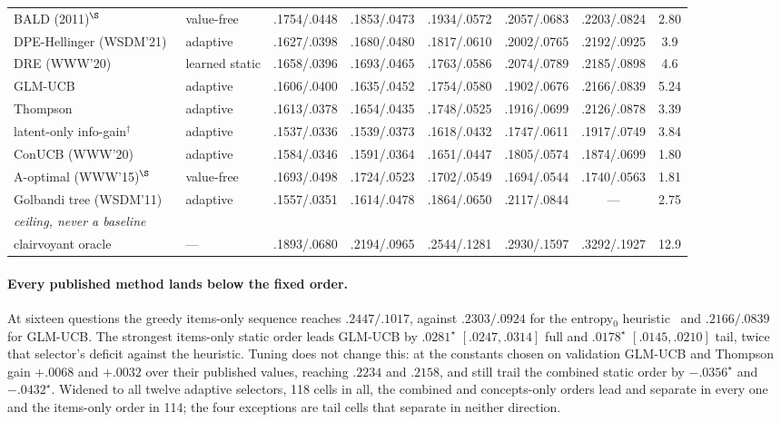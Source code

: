 \documentclass[runningheads]{llncs}
\begin{document}
\begin{table}[tbp]
{\begin{tabular}{llccccc c}
BALD (2011)$^\S$~\cite{houlsby2011bald} & value-free & .1754/.0448 & .1853/.0473 & .1934/.0572 & .2057/.0683 & .2203/.0824 & 2.80 \\
DPE-Hellinger (WSDM'21)~\cite{parapar2021dpe} & adaptive & .1627/.0398 & .1680/.0480 & .1817/.0610 & .2002/.0765 & .2192/.0925 & 3.9 \\
DRE (WWW'20)~\cite{kweon2020deep} & learned static & .1658/.0396 & .1693/.0465 & .1763/.0586 & .2074/.0789 & .2185/.0898 & 4.6 \\
GLM-UCB~\cite{zhao2013interactive} & adaptive & .1606/.0400 & .1635/.0452 & .1754/.0580 & .1902/.0676 & .2166/.0839 & 5.24 \\
Thompson~\cite{zhao2013interactive} & adaptive & .1613/.0378 & .1654/.0435 & .1748/.0525 & .1916/.0699 & .2126/.0878 & 3.39 \\
latent-only info-gain$^\dagger$~\cite{ma2019eddi} & adaptive & .1537/.0336 & .1539/.0373 & .1618/.0432 & .1747/.0611 & .1917/.0749 & 3.84 \\
ConUCB (WWW'20)~\cite{zhang2020conucb} & adaptive & .1584/.0346 & .1591/.0364 & .1651/.0447 & .1805/.0574 & .1874/.0699 & 1.80 \\
A-optimal (WWW'15)$^\S$~\cite{anava2015budget,sepliarskaia2018spq} & value-free & .1693/.0498 & .1724/.0523 & .1702/.0549 & .1694/.0544 & .1740/.0563 & 1.81 \\
Golbandi tree (WSDM'11)~\cite{golbandi2011adaptive} & adaptive & .1557/.0351 & .1614/.0478 & .1864/.0650 & .2117/.0844 & --- & 2.75 \\
\midrule
\multicolumn{8}{l}{\emph{ceiling, never a baseline}}\\
clairvoyant oracle & --- & .1893/.0680 & .2194/.0965 & .2544/.1281 & .2930/.1597 & .3292/.1927 & 12.9 \\
\bottomrule
\end{tabular}}
\end{table}


\paragraph{Every published method lands below the fixed order.}
At sixteen questions the greedy items-only sequence reaches $.2447/.1017$, against $.2303/.0924$ for
the entropy$_0$ heuristic~\cite{rashid2008learning} and $.2166/.0839$ for GLM-UCB. The strongest
items-only static order leads GLM-UCB by $.0281^\star$ $[.0247,.0314]$ full and $.0178^\star$ $[.0145,.0210]$ tail, twice that selector's deficit against the heuristic. Tuning does not change this: at the constants
chosen on validation GLM-UCB and Thompson gain $+.0068$ and $+.0032$ over their published values,
reaching $.2234$ and $.2158$, and still trail the combined static order by $-.0356^\star$ and
$-.0432^\star$. Widened to all twelve adaptive selectors, 118 cells in all, the combined and concepts-only orders
lead and separate in every one and the items-only order in 114; the four exceptions are tail cells
that separate in neither direction.
\end{document}
